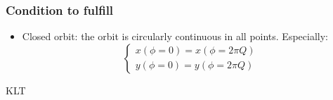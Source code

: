 \documentclass[12pt,a4paper]{article}
\begin{document}
\subsubsection{Condition to fulfill}
\begin{itemize}
	\item Closed orbit: the orbit is circularly continuous in all points. Especially:
	\begin{equation}
	\begin{cases}
	x(\phi = 0) = x(\phi = 2 \pi Q) \\
	y(\phi = 0) = y(\phi = 2 \pi Q)
	\end{cases}
	\end{equation}
\end{itemize}

KLT~\cite{book:wang_2012}


\end{document}
